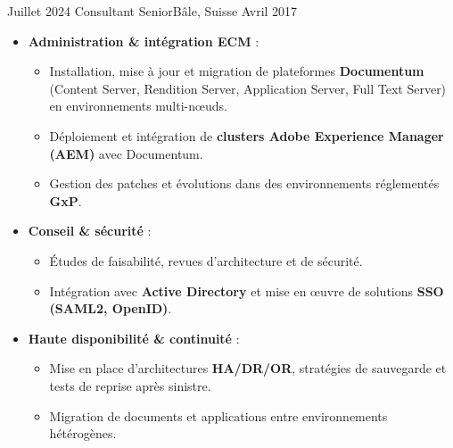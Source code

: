 %
%
%

\begin{experiences}

\experience
    {Juillet 2024} {Consultant Senior}{}{Bâle, Suisse}
    {Avril 2017} {
        \begin{itemize}[left=0pt,label={},itemsep=0.5em]

          \item \textbf{Administration \& intégration ECM} :
            \begin{itemize}[itemsep=0.2em,topsep=0.2em,parsep=0pt]
              \small
              \item Installation, mise à jour et migration de plateformes \textbf{Documentum} (Content Server, Rendition Server, Application Server, Full Text Server) en environnements multi-nœuds.
              \item Déploiement et intégration de \textbf{clusters Adobe Experience Manager (AEM)} avec Documentum.
              \item Gestion des patches et évolutions dans des environnements réglementés \textbf{GxP}.
            \end{itemize}

          \item \textbf{Conseil \& sécurité} :
            \begin{itemize}[itemsep=0.2em,topsep=0.2em,parsep=0pt]
              \small
              \item Études de faisabilité, revues d’architecture et de sécurité.
              \item Intégration avec \textbf{Active Directory} et mise en œuvre de solutions \textbf{SSO (SAML2, OpenID)}.
            \end{itemize}

          \item \textbf{Haute disponibilité \& continuité} :
            \begin{itemize}[itemsep=0.2em,topsep=0.2em,parsep=0pt]
              \small
              \item Mise en place d’architectures \textbf{HA/DR/OR}, stratégies de sauvegarde et tests de reprise après sinistre.
              \item Migration de documents et applications entre environnements hétérogènes.
            \end{itemize}


\end{itemize}}
\end{experiences}
